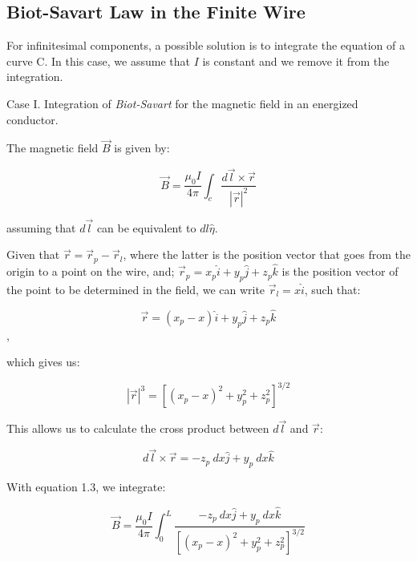 \documentclass[10pt]{article}
\begin{document}
{	

	\subsection{Biot-Savart Law in the Finite Wire}

	For infinitesimal components, a possible solution is to integrate the equation
	of a curve C. In this case, we assume that $I$ is constant and we remove it
	from the integration.

	Case I. Integration of \emph{Biot-Savart} for the magnetic field in an
	energized conductor.

	The magnetic field $\vec{B}$ is given by:

	\begin{equation}
		\vec{B}= \frac{\mu_{0} I}{4\pi}\int_{c} \frac{d \vec{l} \times \vec{r}}{|\vec{r}|^{2}}
	\end{equation}

	assuming that $d\vec{l}$ can be equivalent to $dl \hat{\eta}$.

	Given that $\vec{r}= \vec{r}_{p} - \vec{r}_{l}$, where the latter is the
	position vector that goes from the origin to a point on the wire, and;
	$\vec{r}_{p} = x_{p} \hat i + y_{p} \hat j + z_{p} \hat k$ is the position
	vector of the point to be determined in the field, we can write $\vec{r}_{l} =
	x \hat i$, such that:

	\begin{equation}
		\vec{r}= (x_{p} -x)\hat i + y_{p} \hat j + z_{p} \hat k 
	\end{equation},

	which gives us:

	\begin{equation}
		|\vec{r}|^{3} = \left[(x_{p} - x)^{2} + y_{p}^{2} + z_{p}^{2}\right]^{3/2}
	\end{equation}

	This allows us to calculate the cross product between $d \vec{l}$ and $\vec{r}$:

	\begin{equation}
		d\vec{l}\times \vec{r}= - z_{p} \ dx \hat j + y_{p} \ dx \hat k
	\end{equation}

	With equation 1.3, we integrate:

	\begin{equation}
		\vec{B}= \frac{\mu_{0} I}{4\pi}\int_{0}^{L}\frac{-z_{p} \ dx \hat j + y_{p} \ dx
		\hat k}{\left[(x_{p} - x)^{2} + y_{p}^{2} + z_{p}^{2}\right]^{3/2}}
	\end{equation}

}
\end{document}

